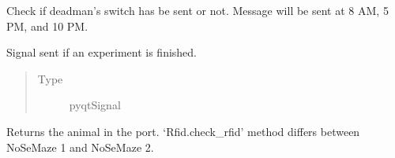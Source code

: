 \documentclass[letterpaper,10pt,english]{sphinxmanual}
\begin{document}
\begin{fulllineitems}
\begin{fulllineitems}
\end{fulllineitems}


\begin{fulllineitems}
\label{\detokenize{NoSeMazeControl/Controllers:Controllers.ExperimentControl.ExperimentWorker.check_status}}
\pysigstartsignatures
{}
\pysigstopsignatures
\sphinxAtStartPar
Check if deadman’s switch has be sent or not. Message will be sent at
8 AM, 5 PM, and 10 PM.

\end{fulllineitems}


\begin{fulllineitems}
\label{\detokenize{NoSeMazeControl/Controllers:Controllers.ExperimentControl.ExperimentWorker.finished}}
\pysigstartsignatures
{}
\pysigstopsignatures
\sphinxAtStartPar
Signal sent if an experiment is finished.
\begin{quote}\begin{description}
\item[{Type}] \leavevmode
\sphinxAtStartPar
pyqtSignal

\end{description}\end{quote}

\end{fulllineitems}


\begin{fulllineitems}
\label{\detokenize{NoSeMazeControl/Controllers:Controllers.ExperimentControl.ExperimentWorker.get_present_animal}}
\pysigstartsignatures
{}
\pysigstopsignatures
\sphinxAtStartPar
Returns the animal in the port. ‘Rfid.check\_rfid’ method differs
between NoSeMaze 1 and NoSeMaze 2.


\end{fulllineitems}
\end{fulllineitems}
\end{document}
